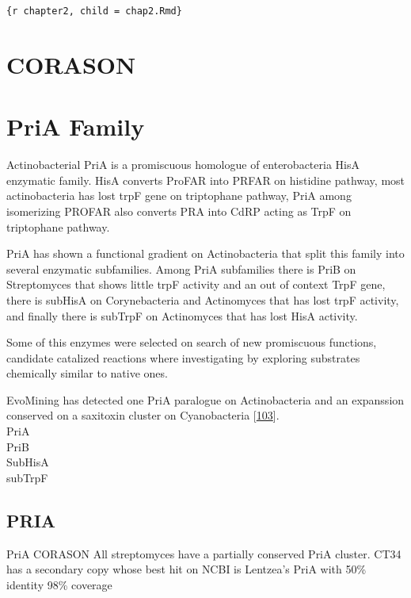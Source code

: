 \documentclass[12pt,twoside]{reedthesis}
\begin{document}
  \texttt{\{r\ chapter2,\ child\ =\ \textquotesingle{}chap2.Rmd\textquotesingle{}\}}
  
  \hypertarget{ref_labels}{\chapter{CORASON}\label{ref_labels}}
  
  \hypertarget{ref_labels}{\chapter{PriA Family}\label{ref_labels}}
  
  Actinobacterial PriA is a promiscuous homologue of enterobacteria HisA
  enzymatic family. HisA converts ProFAR into PRFAR on histidine pathway,
  most actinobacteria has lost trpF gene on triptophane pathway, PriA
  among isomerizing PROFAR also converts PRA into CdRP acting as TrpF on
  triptophane pathway.
  
  PriA has shown a functional gradient on Actinobacteria that split this
  family into several enzymatic subfamilies. Among PriA subfamilies there
  is PriB on Streptomyces that shows little trpF activity and an out of
  context TrpF gene, there is subHisA on Corynebacteria and Actinomyces
  that has lost trpF activity, and finally there is subTrpF on Actinomyces
  that has lost HisA activity.
  
  Some of this enzymes were selected on search of new promiscuous
  functions, candidate catalized reactions where investigating by
  exploring substrates chemically similar to native ones.
  
  EvoMining has detected one PriA paralogue on Actinobacteria and an
  expanssion conserved on a saxitoxin cluster on Cyanobacteria
  {[}\protect\hyperlink{ref-moustafa_origin_2009}{103}{]}.\\
  PriA\\
  PriB\\
  SubHisA\\
  subTrpF\\
  \clearpage   
  
  \section{PRIA}\label{pria}
  
  PriA CORASON All streptomyces have a partially conserved PriA cluster.
  CT34 has a secondary copy whose best hit on NCBI is Lentzea's PriA with
  50\% identity 98\% coverage
  
\end{document}
